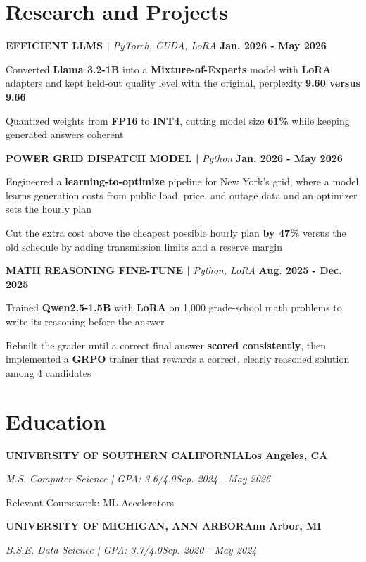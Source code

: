 \documentclass[10pt]{article}
\renewcommand{\note}[1]{#1\par}
\newcommand{\school}[4]{%
  \vspace{2pt}%
  \textbf{\MakeUppercase{#1}}\hfill\textbf{#2}\par
  \vspace{0.5pt}%
  \textit{#3}\hfill\textit{#4}\par
}
\newcommand{\proj}[4]{%
  \vspace{3pt}%
  \textbf{\MakeUppercase{#1} | }\textit{#2}\hfill
  \textbf{#4}%
  \notblank{#3}{\ \textbf{| #3}}{}%
  \par
}
\begin{document}
\section{Research and Projects}
\vspace{-3pt}
\proj{Efficient LLMs}{PyTorch, CUDA, LoRA}{USC}{Jan. 2026 - May 2026}
\begin{bullets}
  \item Converted \textbf{Llama 3.2-1B} into a \textbf{Mixture-of-Experts} model with \textbf{LoRA} adapters and kept held-out quality level with the original, perplexity \textbf{9.60 versus 9.66}
  \item Quantized weights from \textbf{FP16} to \textbf{INT4}, cutting model size \textbf{61\%} while keeping generated answers coherent
\end{bullets}

\proj{Power Grid Dispatch Model}{Python}{USC}{Jan. 2026 - May 2026}
\begin{bullets}
  \item Engineered a \textbf{learning-to-optimize} pipeline for New York's grid, where a model learns generation costs from public load, price, and outage data and an optimizer sets the hourly plan
  \item Cut the extra cost above the cheapest possible hourly plan \textbf{by 47\%} versus the old schedule by adding transmission limits and a reserve margin
\end{bullets}

\proj{Math Reasoning Fine-Tune}{Python, LoRA}{USC}{Aug. 2025 - Dec. 2025}
\begin{bullets}
  \item Trained \textbf{Qwen2.5-1.5B} with \textbf{LoRA} on 1,000 grade-school math problems to write its reasoning before the answer
  \item Rebuilt the grader until a correct final answer \textbf{scored consistently}, then implemented a \textbf{GRPO} trainer that rewards a correct, clearly reasoned solution among 4 candidates
\end{bullets}

\section{Education}
\vspace{-2pt}
\school{University of Southern California}{Los Angeles, CA}{M.S. Computer Science | GPA: 3.6/4.0}{Sep. 2024 - May 2026}
\note{Relevant Coursework: ML Accelerators}

\school{University of Michigan, Ann Arbor}{Ann Arbor, MI}{B.S.E. Data Science | GPA: 3.7/4.0}{Sep. 2020 - May 2024}
\end{document}
